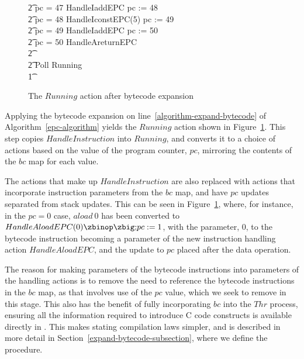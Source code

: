 \begin{figure}[p!]
\begin{minipage}{0.5\textwidth}
{\begin{circus}
    \t2 {} \circelse pc = 47 \circthen HandleIaddEPC \circseq pc := 48 \\
    \t2 {} \circelse pc = 48 \circthen HandleIconstEPC(5) \circseq pc := 49 \\
    \t2 {} \circelse pc = 49 \circthen HandleIaddEPC \circseq pc := 50 \\
    \t2 {} \circelse pc = 50 \circthen HandleAreturnEPC \\
    \t2 {} \cdots {} \\
    \t2 \circfi \circseq Poll \circseq Running \\
    \t1 \circfi
  \end{circus}
  }
  \end{minipage}
  \normalsize
  \caption{The $Running$ action after bytecode expansion}
  \label{bytecode-expansion-example-figure}
\end{figure}

Applying the bytecode expansion on
line~\ref{algorithm-expand-bytecode} of Algorithm~\ref{epc-algorithm}
yields the $Running$ action shown in
Figure~\ref{bytecode-expansion-example-figure}.
This step copies $HandleInstruction$ into $Running$, and converts it
to a choice of actions based on the value of the program counter,
$pc$, mirroring the contents of the $bc$ map for each value.

The actions that make up $HandleInstruction$ are also replaced with
actions that incorporate instruction parameters from the $bc$ map, and
have $pc$ updates separated from stack updates.
This can be seen in Figure~\ref{bytecode-expansion-example-figure},
where, for instance, in the $pc = 0$ case, $aload~0$ has been
converted to $HandleAloadEPC(0) \circseq pc := 1$, with the parameter,
$0$, to the bytecode instruction becoming a parameter of the new
instruction handling action $HandleAloadEPC$, and the update to $pc$
placed after the data operation.

The reason for making parameters of the bytecode instructions into
parameters of the handling actions is to remove the need to reference
the bytecode instructions in the $bc$ map, as that involves use of the
$pc$ value, which we seek to remove in this stage.
This also has the benefit of fully incorporating $bc$ into the $Thr$
process, ensuring all the information required to introduce C code
constructs is available directly in \Circus{}.
This makes stating compilation laws simpler, and is described in more
detail in Section~\ref{expand-bytecode-subsection}, where we define
the  procedure.

